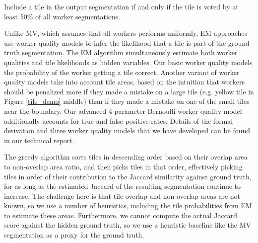 \par \noindent Include a tile in the output segmentation if and only if the tile is voted by at least 50\% of all worker segmentations.

\par \noindent Unlike MV, which assumes that all workers performs uniformly, EM approaches use worker quality models to infer the likelihood that a tile is part of the ground truth segmentation. The EM algorithm simultaneously estimate both worker qualities and tile likelihoods as hidden variables. Our basic worker quality models the probability of the worker getting a tile correct. Another variant of worker quality models take into account tile areas, based on the intuition that workers should be penalized more if they made a mistake on a large tile (e.g. yellow tile in Figure \ref{tile_demo} middle) than if they made a mistake on one of the small tiles near the boundary. Our advanced 4-parameter Bernoulli worker quality model additionally accounts for true and false positive rates. Details of the formal derivation and three worker quality models that we have developed can be found in our technical report.

\par \noindent The greedy algorithm sorts tiles in descending order based on their overlap area to non-overlap area ratio, and then picks tiles in that order, effectively picking tiles in order of their contribution to the Jaccard similarity against ground truth, for as long as the estimated Jaccard of the resulting segmentation continue to increase. The challenge here is that tile overlap and non-overlap areas are not known, so we use a number of heuristics, including the tile probabilities from EM to estimate these areas. Furthermore, we cannot compute the actual Jaccard score against the hidden ground truth, so we use a heuristic baseline like the MV segmentation as a proxy for the ground truth.

